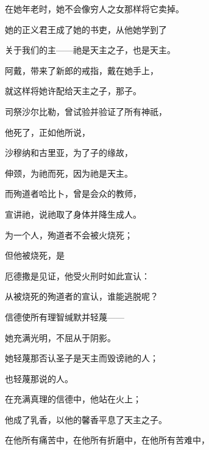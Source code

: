 在她年老时，她不会像穷人之女那样将它卖掉。\par

她的正义君王成了她的书吏，从他她学到了\par

关于我们的主——祂是天主之子，也是天主。\par

阿戴，带来了新郎的戒指，戴在她手上，\par

就这样将她许配给天主之子，那子。\par

司祭沙尔比勒，曾试验并验证了所有神祇，\par

他死了，正如他所说，\par

沙穆纳和古里亚，为了子的缘故，\par

伸颈，为祂而死，因为祂是天主。\par

而殉道者哈比卜，曾是会众的教师，\par

宣讲祂，说祂取了身体并降生成人。\par

为一个人，殉道者不会被火烧死；\par

但他被烧死，是\par

厄德撒是见证，他受火刑时如此宣认：\par

从被烧死的殉道者的宣认，谁能逃脱呢？\par

信德使所有理智缄默并轻蔑——\par

她充满光明，不屈从于阴影。\par

她轻蔑那否认圣子是天主而毁谤祂的人；\par

也轻蔑那说的人。\par

在充满真理的信德中，他站在火上；\par

他成了乳香，以他的馨香平息了天主之子。\par

在他所有痛苦中，在他所有折磨中，在他所有苦难中，\par

